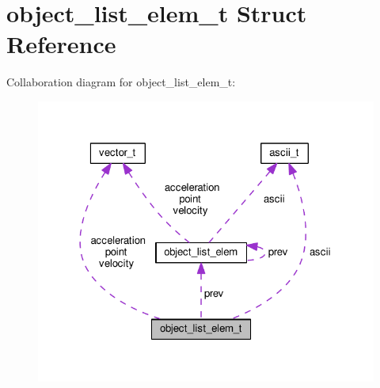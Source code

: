 \hypertarget{structobject__list__elem__t}{}\section{object\+\_\+list\+\_\+elem\+\_\+t Struct Reference}
\label{structobject__list__elem__t}


Collaboration diagram for object\+\_\+list\+\_\+elem\+\_\+t\+:\nopagebreak
\begin{figure}[H]
\begin{center}
\leavevmode
\includegraphics[width=322pt]{structobject__list__elem__t__coll__graph}
\end{center}
\end{figure}
